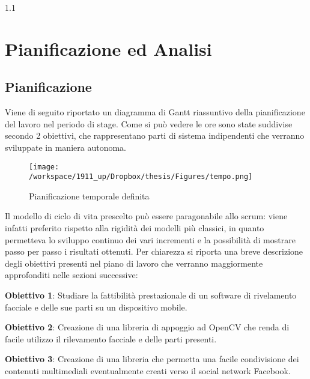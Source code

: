 
1.1\chapter{Pianificazione ed Analisi} %

\label{Capitolo 3} %



\section{Pianificazione}

Viene di seguito riportato un diagramma di Gantt riassuntivo della pianificazione
del lavoro nel periodo di stage. Come si può vedere le ore sono state suddivise secondo
2 obiettivi, che rappresentano parti di sistema indipendenti che verranno sviluppate
in maniera autonoma.\\

\begin{figure}[h]\centering  
\texttt{[image: /workspace/1911\_up/Dropbox/thesis/Figures/tempo.png]}
\caption[Pianificazione temporale]{Pianificazione temporale definita}
\label{pic-a}
\end{figure}

Il modello di ciclo di vita prescelto può essere paragonabile allo scrum: viene infatti preferito rispetto alla rigidità dei modelli più classici, in
quanto permetteva lo sviluppo continuo dei vari incrementi e la possibilità di mostrare
passo per passo i risultati ottenuti. Per chiarezza si riporta una breve descrizione degli
obiettivi presenti nel piano di lavoro che verranno maggiormente approfonditi nelle
sezioni successive:

\textbf{Obiettivo 1}: Studiare la fattibilità prestazionale di un software di rivelamento facciale e delle sue parti su un dispositivo mobile.

\textbf{Obiettivo 2}: Creazione di una libreria di appoggio ad OpenCV che renda di facile utilizzo il rilevamento facciale e delle parti presenti.

\textbf{Obiettivo 3}: Creazione di una libreria che permetta una facile condivisione dei contenuti multimediali eventualmente creati verso il social network Facebook.


